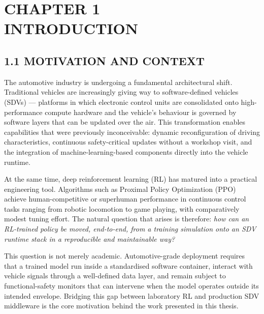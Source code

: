 \documentclass[12pt,a4paper]{article}
\begin{document}
\setcounter{page}{1}

\section*{\centering CHAPTER 1\\[0.3cm] INTRODUCTION}
\vspace{2\baselineskip}

\subsection*{1.1 \quad MOTIVATION AND CONTEXT}

\indent The automotive industry is undergoing a fundamental architectural shift.
Traditional vehicles are increasingly giving way to software-defined vehicles
(SDVs) --- platforms in which electronic control units are consolidated onto
high-performance compute hardware and the vehicle's behaviour is governed by
software layers that can be updated over the air. This transformation enables
capabilities that were previously inconceivable: dynamic reconfiguration of
driving characteristics, continuous safety-critical updates without a workshop
visit, and the integration of machine-learning-based components directly into
the vehicle runtime.

At the same time, deep reinforcement learning (RL) has matured into a practical
engineering tool. Algorithms such as Proximal Policy Optimization (PPO)
\cite{Schulman2017} achieve human-competitive or superhuman performance in
continuous control tasks ranging from robotic locomotion to game playing, with
comparatively modest tuning effort. The natural question that arises is
therefore: \emph{how can an RL-trained policy be moved, end-to-end, from a
training simulation onto an SDV runtime stack in a reproducible and maintainable
way?}

This question is not merely academic. Automotive-grade deployment requires that
a trained model run inside a standardised software container, interact with
vehicle signals through a well-defined data layer, and remain subject to
functional-safety monitors that can intervene when the model operates outside
its intended envelope. Bridging this gap between laboratory RL and production
SDV middleware is the core motivation behind the work presented in this thesis.
\end{document}
